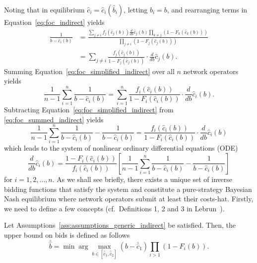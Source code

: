 Noting that in equilibrium $\hat{c}_i = \hat{c}_i(\hat{b}_i)$, letting $\hat{b}_i = b$, and rearranging terms in Equation~\eqref{eq:foc_indirect} yields
\begin{align}
  \label{eq:foc_simplified_indirect}
  \frac{1}{b - \hat{c}_i(b)} 
  &= \frac{\sum_{j\neq i} f_j(\hat{c}_j(b))\frac{d}{db}\hat{c}_j(b)\prod_{k\neq j} \left( 1 - F_k(\hat{c}_k(b)) \right)}{\prod_{j\neq i} \left( 1 - F_j(\hat{c}_j(b)) \right)}\nonumber \\[2ex]
  &= \sum_{j\neq i}\frac{f_j(\hat{c}_j(b))}{1 - F_j(\hat{c}_j(b))}\cdot\frac{d}{db}\hat{c}_j(b).
\end{align}
Summing Equation~\eqref{eq:foc_simplified_indirect} over all $n$ network operators yields
\begin{equation}
  \label{eq:foc_summed_indirect}
  \frac{1}{n-1}\sum_{i=1}^n \frac{1}{b - \hat{c}_i(b)} = \sum_{i=1}^n \frac{f_i(\hat{c}_i(b))}{1 - F_i(\hat{c}_i(b))}\cdot\frac{d}{db}\hat{c}_i(b).
\end{equation}
Subtracting Equation~\eqref{eq:foc_simplified_indirect} from \eqref{eq:foc_summed_indirect} yields 
\begin{equation*}
  \frac{1}{n-1}\sum_{i=1}^n \frac{1}{b - \hat{c}_i(b)} - \frac{1}{b - \hat{c}_i(b)} = \frac{f_i(\hat{c}_i(b))}{1 - F_i(\hat{c}_i(b))}\cdot\frac{d}{db}\hat{c}_i(b)
\end{equation*}
which leads to the system of nonlinear ordinary differential equations (ODE)
\begin{equation*}
  \frac{d}{db}\hat{c}_i(b) = \frac{1 - F_i(\hat{c}_i(b))}{f_i(\hat{c}_i(b))}\left[ \frac{1}{n-1}\sum_{i=1}^n \frac{1}{b-\hat{c}_i(b)} - \frac{1}{b-\hat{c}_i(b)} \right]
\end{equation*}
for $i=1,2,\dotsc,n$. As we shall see briefly, there exists a unique set of inverse bidding functions that satisfy the system and constitute a pure-strategy Bayesian Nash equilibrium where network operators submit at least their costs-hat. Firstly, we need to define a few concepts (cf.~Definitions 1, 2 and 3 in Lebrun~\cite{Lebrun2006}).

\begin{define}
\label{def:upper_bound_bids_indirect}
Let Assumptions~\ref{ass:assumptions_generic_indirect} be satisfied. Then, the upper bound on bids is defined as follows
\begin{equation}
  \label{eq:upper_bound_bids_indirect}
  \bar{\hat{b}} = \min\arg\max_{b\in[\bar{\hat{c}}_1, \bar{\hat{c}}_2]}(b - \bar{\hat{c}}_1)\prod_{i>1}\left( 1 - F_i(b) \right).
\end{equation}
\end{define}

